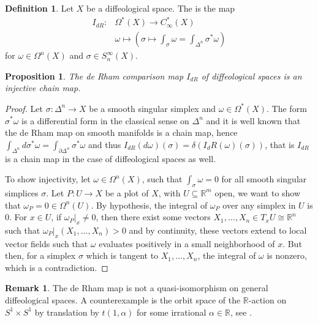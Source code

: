 \documentclass{scrartcl}
\let\emph\relax
\theoremstyle{plain}
\newtheorem{proposition}[theorem]{Proposition}
\theoremstyle{definition}
\newtheorem{definition}[theorem]{Definition}
\newtheorem{remark}[theorem]{Remark}
\newcommand{\R}{\mathbb R}
\renewcommand{\subset}{\subseteq}
\newcommand{\iso}{\cong}
\begin{document}
\begin{definition}
    Let $X$ be a diffeological space. The \emph{de Rham comparison map} is the map 
    \begin{align*}
        I_{dR}\colon &\Omega^*(X) \to C^*_\infty(X) \\
        &\omega \mapsto \left(\sigma\mapsto \int_{\sigma}\omega = \int_{\Delta^n}\sigma^*\omega\right)
    \end{align*}
    for $\omega\in\Omega^n(X)$ and $\sigma\in S_n^\infty(X)$.
\end{definition}

\begin{proposition}\label{thm:deRham-properties}
    The de Rham comparison map $I_{dR}$ of diffeological spaces is an injective chain map.
\end{proposition}
\begin{proof}
    Let $\sigma\colon\Delta^n\to X$ be a smooth singular simplex and $\omega\in\Omega^*(X)$. The form $\sigma^*\omega$ is a differential form in the classical sense on $\Delta^n$ and it is well known that the de Rham map on smooth manifolds is a chain map, hence $\int_{\Delta^n}d\sigma^*\omega = \int_{\partial\Delta^n}\sigma^*\omega$ and thus $I_{dR}(d\omega)(\sigma) = \delta(I_dR(\omega)(\sigma))$, that is $I_{dR}$ is a chain map in the case of diffeological spaces as well. 
    
    To show injectivity, let $\omega\in \Omega^n(X)$, such that $\int_\sigma \omega = 0$ for all smooth singular simplices $\sigma$. Let $P\colon U\to X$ be a plot of $X$, with $U\subset \R^m$ open, we want to show that $\omega_P = 0\in\Omega^n(U)$. By hypothesis, the integral of $\omega_P$ over any simplex in $U$ is $0$. For $x\in U$, if $\omega_P|_x\neq 0$, then there exist some vectors $X_1,\dots, X_n\in T_xU \iso \R^n$ such that $\omega_P|_x(X_1, \dots, X_n) > 0$ and by continuity, these vectors extend to local vector fields such that $\omega$ evaluates positively in a small neighborhood of $x$. But then, for a simplex $\sigma$ which is tangent to $X_1, \dots, X_n$, the integral of $\omega$ is nonzero, which is a contradiction. 
\end{proof}

\begin{remark}
The de Rham map is not a quasi-isomorphism on general diffeological spaces. A counterexample is the orbit space of the $\R$-action on $S^1\times S^1$ by translation by $t(1, \alpha)$ for some irrational $\alpha\in \R$, see \cite{iglesias2013diffeology}.
\end{remark}
\end{document}
